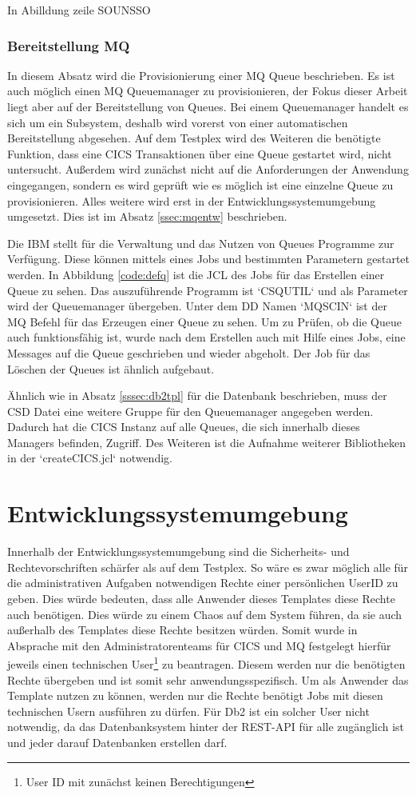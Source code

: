 In Abilldung zeile SOUNSSO

\subsubsection{Bereitstellung MQ}\label{sssec:mqtplx}
In diesem Absatz wird die Provisionierung einer MQ Queue beschrieben.
Es ist auch möglich einen MQ Queuemanager zu provisionieren, der Fokus dieser Arbeit liegt aber auf der Bereitstellung von Queues.
Bei einem Queuemanager handelt es sich um ein Subsystem, deshalb wird vorerst von einer automatischen Bereitstellung abgesehen.
Auf dem Testplex wird des Weiteren die benötigte Funktion, dass eine CICS Transaktionen über eine Queue gestartet wird, nicht untersucht.
Außerdem wird zunächst nicht auf die Anforderungen der Anwendung eingegangen, sondern es wird geprüft wie es möglich ist eine einzelne Queue zu provisionieren.
Alles weitere wird erst in der Entwicklungssystemumgebung umgesetzt.
Dies ist im Absatz \ref{ssec:mqentw} beschrieben.

Die IBM stellt für die Verwaltung und das Nutzen von Queues Programme zur Verfügung.
Diese können mittels eines Jobs und bestimmten Parametern gestartet werden.
In Abbildung \ref{code:defq} ist die JCL des Jobs für das Erstellen einer Queue zu sehen.
Das auszuführende Programm ist `CSQUTIL` und als Parameter wird der Queuemanager übergeben.
Unter dem DD Namen `MQSCIN` ist der MQ Befehl für das Erzeugen einer Queue zu sehen.
Um zu Prüfen, ob die Queue auch funktionsfähig ist, wurde nach dem Erstellen auch mit Hilfe eines Jobs, eine Messages auf die Queue geschrieben und wieder abgeholt.
Der Job für das Löschen der Queues ist ähnlich aufgebaut.

Ähnlich wie in Absatz \ref{sssec:db2tpl} für die Datenbank beschrieben, muss der CSD Datei eine weitere Gruppe für den Queuemanager angegeben werden.
Dadurch hat die CICS Instanz auf alle Queues, die sich innerhalb dieses Managers befinden, Zugriff.
Des Weiteren ist die Aufnahme weiterer Bibliotheken in der `createCICS.jcl` notwendig.

\section{Entwicklungssystemumgebung}
Innerhalb der Entwicklungssystemumgebung sind die Sicherheits- und Rechtevorschriften schärfer als auf dem Testplex.
So wäre es zwar möglich alle für die administrativen Aufgaben notwendigen Rechte einer persönlichen UserID zu geben.
Dies würde bedeuten, dass alle Anwender dieses Templates diese Rechte auch benötigen.
Dies würde zu einem Chaos auf dem System führen, da sie auch außerhalb des Templates diese Rechte besitzen würden.
Somit wurde in Absprache mit den Administratorenteams für CICS und MQ festgelegt hierfür jeweils einen technischen User\footnote{User ID mit zunächst keinen Berechtigungen} zu beantragen.
Diesem werden nur die benötigten Rechte übergeben und ist somit sehr anwendungsspezifisch.
Um als Anwender das Template nutzen zu können, werden nur die Rechte benötigt Jobs mit diesen technischen Usern ausführen zu dürfen.
Für Db2 ist ein solcher User nicht notwendig, da das Datenbanksystem hinter der REST-API für alle zugänglich ist und jeder darauf Datenbanken erstellen darf.

